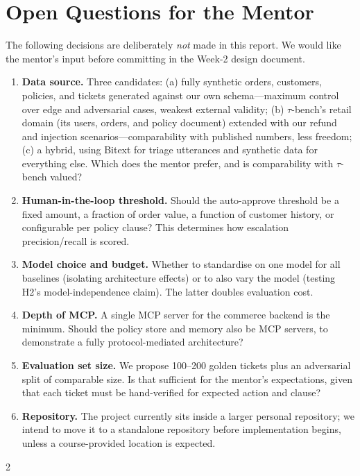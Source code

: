 \documentclass[11pt,a4paper]{article}
\begin{document}
\section{Open Questions for the Mentor}\label{sec:open}

The following decisions are deliberately \emph{not} made in this report. We would like the mentor's input before committing in the Week-2 design document.

\begin{enumerate}[label=\textbf{Q\arabic*.}]
  \item \textbf{Data source.} Three candidates: (a) fully synthetic orders, customers, policies, and tickets generated against our own schema---maximum control over edge and adversarial cases, weakest external validity; (b) $\tau$-bench's retail domain (its users, orders, and policy document) extended with our refund and injection scenarios---comparability with published numbers, less freedom; (c) a hybrid, using Bitext for triage utterances and synthetic data for everything else. Which does the mentor prefer, and is comparability with $\tau$-bench valued?
  \item \textbf{Human-in-the-loop threshold.} Should the auto-approve threshold be a fixed amount, a fraction of order value, a function of customer history, or configurable per policy clause? This determines how escalation precision/recall is scored.
  \item \textbf{Model choice and budget.} Whether to standardise on one model for all baselines (isolating architecture effects) or to also vary the model (testing H2's model-independence claim). The latter doubles evaluation cost.
  \item \textbf{Depth of MCP.} A single MCP server for the commerce backend is the minimum. Should the policy store and memory also be MCP servers, to demonstrate a fully protocol-mediated architecture?
  \item \textbf{Evaluation set size.} We propose 100--200 golden tickets plus an adversarial split of comparable size. Is that sufficient for the mentor's expectations, given that each ticket must be hand-verified for expected action and clause?
  \item \textbf{Repository.} The project currently sits inside a larger personal repository; we intend to move it to a standalone repository before implementation begins, unless a course-provided location is expected.
\end{enumerate}

\renewcommand{\bibfont}{\footnotesize}
\setlength{\bibsep}{1.5pt}

\begin{multicols}{2}
\raggedright

\end{multicols}
\end{document}
